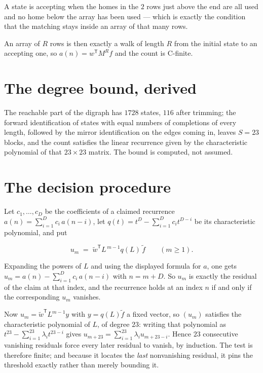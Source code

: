 \documentclass[11pt]{article}
\theoremstyle{definition}
\begin{document}
A state is accepting when the homes in the $2$ rows just above the end are all used and no home below the array has been used --- which is exactly the condition that the matching stays inside an array of that many rows.

An array of $R$ rows is then exactly a walk of length $R$ from the initial state to an accepting one, so $a(n) = w^{\mathsf T}M^{R}f$ and the count is C-finite.

\section{The degree bound, derived}

The reachable part of the digraph has $1728$ states, $116$ after trimming; the forward identification of states with equal numbers of completions of every length, followed by the mirror identification on the edges coming in, leaves $S = 23$ blocks, and the count satisfies the linear recurrence given by the characteristic polynomial of that $23\times23$ matrix. The bound is computed, not assumed.

\section{The decision procedure}

Let $c_1,\dots,c_D$ be the coefficients of a claimed recurrence $a(n) = \sum_{i=1}^{D} c_i\,a(n-i)$, let $q(t) = t^{D} - \sum_{i=1}^{D} c_i t^{D-i}$ be its characteristic polynomial, and put

\[u_m \;=\; \tilde w^{\mathsf T} L^{\,m-1} q(L)\,\tilde f \qquad (m \ge 1).\]

Expanding the powers of $L$ and using the displayed formula for $a$, one gets $u_m = a(n) - \sum_{i=1}^{D} c_i\,a(n-i)$ with $n = m + D$. So $u_m$ is exactly the residual of the claim at that index, and the recurrence holds at an index $n$ if and only if the corresponding $u_m$ vanishes.

Now $u_m = \tilde w^{\mathsf T} L^{m-1} y$ with $y = q(L)\tilde f$ a fixed vector, so $(u_m)$ satisfies the characteristic polynomial of $L$, of degree $23$: writing that polynomial as $t^{23} - \sum_{i=1}^{23} \lambda_i t^{23-i}$ gives $u_{m+23} = \sum_{i=1}^{23} \lambda_i u_{m+23-i}$. Hence $23$ consecutive vanishing residuals force every later residual to vanish, by induction. The test is therefore finite; and because it locates the {\itshape last} nonvanishing residual, it pins the threshold exactly rather than merely bounding it.
\end{document}
